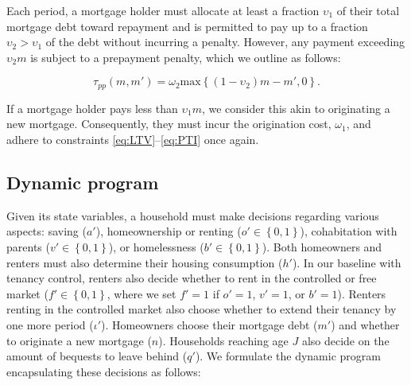 \documentclass[parskip=full]{article}
\begin{document}
Each period, a mortgage holder must allocate at least a fraction $\upsilon_{1}$ of their total mortgage debt toward repayment and is permitted to pay up to a fraction $\upsilon_{2}>\upsilon_{1}$ of the debt without incurring a penalty. However, any payment exceeding $\upsilon_{2}m$ is subject to a prepayment penalty, which we outline as follows:

\begin{equation}\label{eq:prepayment_penalty}
\tau_{pp}(m,m')=\omega_{2}\mbox{max}\left\{(1-\upsilon_{2})m-m',0\right\}.
\end{equation}

\noindent If a mortgage holder pays less than $\upsilon_{1}m$, we consider this akin to originating a new mortgage. Consequently, they must incur the origination cost, $\omega_{1}$, and adhere to constraints \eqref{eq:LTV}--\eqref{eq:PTI} once again.

\subsection{Dynamic program}\label{subsection:household_optimization}
Given its state variables, a household must make decisions regarding various aspects: saving ($a'$), homeownership or renting ($o' \in \left\{0,1\right\}$), cohabitation with parents ($v' \in \left\{0,1\right\}$), or homelessness ($b' \in \left\{0,1\right\}$). Both homeowners and renters must also determine their housing consumption ($h'$). In our baseline with tenancy control, renters also decide whether to rent in the controlled or free market ($f' \in \left\{0,1\right\}$, where we set $f'=1$ if $o'=1$, $v'=1$, or $b'=1$). Renters renting in the controlled market also choose whether to extend their tenancy by one more period ($\iota'$). Homeowners choose their mortgage debt ($m'$) and whether to originate a new mortgage ($n$). Households reaching age $J$ also decide on the amount of bequests to leave behind ($q'$). We formulate the dynamic program encapsulating these decisions as follows:
\end{document}
